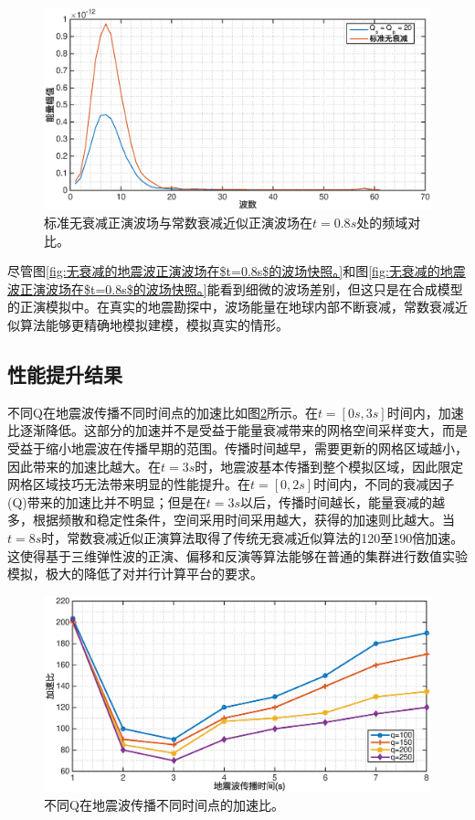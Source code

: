 \documentclass[degree=doctor]{thuthesis}
\begin{document}
\begin{figure}[ht]
\centering
\includegraphics[width=0.9\columnwidth]{stdqwavefield.eps}
\caption{标准无衰减正演波场与常数衰减近似正演波场在$t=0.8s$处的频域对比。}
\label{fig:stdqwavefield}
\end{figure}

尽管图\ref{fig:无衰减的地震波正演波场在$t=0.8s$的波场快照。}和图\ref{fig:无衰减的地震波正演波场在$t=0.8s$的波场快照。}能看到细微的波场差别，但这只是在合成模型的正演模拟中。在真实的地震勘探中，波场能量在地球内部不断衰减，常数衰减近似算法能够更精确地模拟建模，模拟真实的情形。

\subsection{性能提升结果}

不同Q在地震波传播不同时间点的加速比如图\ref{fig:diffqspeedup}所示。在$t=[0s,3s]$时间内，加速比逐渐降低。这部分的加速并不是受益于能量衰减带来的网格空间采样变大，而是受益于缩小地震波在传播早期的范围。传播时间越早，需要更新的网格区域越小，因此带来的加速比越大。在$t=3s$时，地震波基本传播到整个模拟区域，因此限定网格区域技巧无法带来明显的性能提升。在$t=[0,2s]$时间内，不同的衰减因子(Q)带来的加速比并不明显；但是在$t=3s$以后，传播时间越长，能量衰减的越多，根据频散和稳定性条件，空间采用时间采用越大，获得的加速则比越大。当$t=8s$时，常数衰减近似正演算法取得了传统无衰减近似算法的120至190倍加速。这使得基于三维弹性波的正演、偏移和反演等算法能够在普通的集群进行数值实验模拟，极大的降低了对并行计算平台的要求。

\begin{figure}[ht]
\centering
\includegraphics[width=0.9\columnwidth]{不同Q的加速比.eps}
\caption{不同Q在地震波传播不同时间点的加速比。}
\label{fig:diffqspeedup}
\end{figure}
\end{document}
